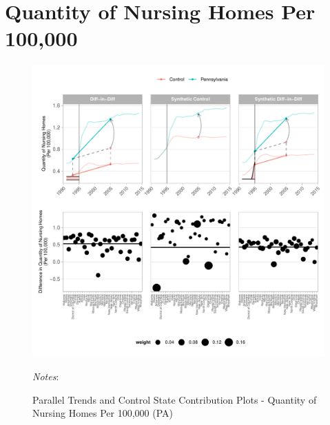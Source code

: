 \documentclass[12pt]{article}
\begin{document}
	
	
	\maketitle

\medskip

\thispagestyle{empty}

\clearpage

\onehalfspacing
\setcounter{footnote}{0}
\renewcommand{\thefootnote}{\arabic{footnote}}
\setcounter{page}{1}

\doublespacing
\setcounter{footnote}{0}
\renewcommand{\thefootnote}{\arabic{footnote}}
\setcounter{page}{1}

\doublespacing

\newpage
\vspace*{8cm}
\section{Quantity of Nursing Homes Per 100,000}
\clearpage

\newpage
\begin{figure}[t]
	\begin{center}
	\caption{\centering Parallel Trends and Control State Contribution Plots - Quantity of Nursing Homes Per 100,000 (PA)}
    \includegraphics[width=\textwidth,keepaspectratio]{q_nursing_homes_plots_PA.pdf}
    \end{center}
    \footnotesize
		\textit{Notes}:
\end{figure}
\clearpage
\end{document}
